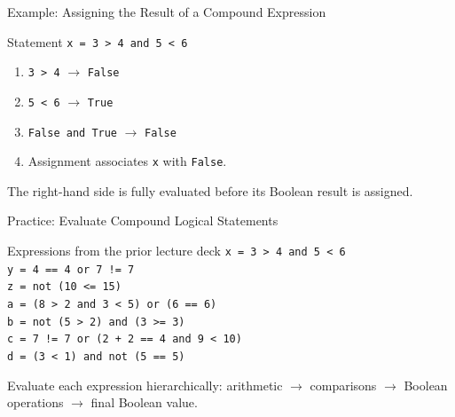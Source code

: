 \documentclass[aspectratio=169,10pt]{beamer}
\begin{document}
\begin{frame}{Example: Assigning the Result of a Compound Expression}
  \begin{block}{Statement}
    \centering
    \Large\texttt{x = 3 > 4 and 5 < 6}
  \end{block}

  \begin{enumerate}
    \item \texttt{3 > 4} $\longrightarrow$ \texttt{False}
    \item \texttt{5 < 6} $\longrightarrow$ \texttt{True}
    \item \texttt{False and True} $\longrightarrow$ \texttt{False}
    \item Assignment associates \texttt{x} with \texttt{False}.
  \end{enumerate}

  \begin{keyidea}
    The right-hand side is fully evaluated before its Boolean result is assigned.
  \end{keyidea}
\end{frame}

\begin{frame}[shrink=6]{Practice: Evaluate Compound Logical Statements}
  \begin{block}{Expressions from the prior lecture deck}
    \texttt{x = 3 > 4 and 5 < 6}\\
    \texttt{y = 4 == 4 or 7 != 7}\\
    \texttt{z = not (10 <= 15)}\\
    \texttt{a = (8 > 2 and 3 < 5) or (6 == 6)}\\
    \texttt{b = not (5 > 2) and (3 >= 3)}\\
    \texttt{c = 7 != 7 or (2 + 2 == 4 and 9 < 10)}\\
    \texttt{d = (3 < 1) and not (5 == 5)}
  \end{block}

  \begin{activity}
    Evaluate each expression hierarchically: arithmetic $\rightarrow$ comparisons $\rightarrow$ Boolean operations $\rightarrow$ final Boolean value.
  \end{activity}
\end{frame}

\end{document}
